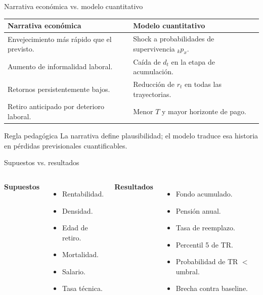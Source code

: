 \documentclass[aspectratio=169,11pt]{beamer}
\newcommand{\supuestos}{\textbf{Supuestos}}
\newcommand{\resultados}{\textbf{Resultados}}
\newcommand{\narrativa}{\textbf{Narrativa económica}}
\newcommand{\modelo}{\textbf{Modelo cuantitativo}}
\begin{document}
\begin{frame}{Narrativa económica vs. modelo cuantitativo}
\begin{table}
\centering
\begin{tabular}{p{}p{}}
\toprule
\narrativa & \modelo \\
\midrule
Envejecimiento más rápido que el previsto. & Shock a probabilidades de supervivencia ${}_{k}p_x$. \\
Aumento de informalidad laboral. & Caída de $d_t$ en la etapa de acumulación. \\
Retornos persistentemente bajos. & Reducción de $r_t$ en todas las trayectorias. \\
Retiro anticipado por deterioro laboral. & Menor $T$ y mayor horizonte de pago. \\
\bottomrule
\end{tabular}
\end{table}

\begin{block}{Regla pedagógica}
La narrativa define plausibilidad; el modelo traduce esa historia en pérdidas previsionales cuantificables.
\end{block}
\end{frame}

\begin{frame}{Supuestos vs. resultados}
\begin{columns}
\textbf{\supuestos}
\begin{itemize}
  \item Rentabilidad.
  \item Densidad.
  \item Edad de retiro.
  \item Mortalidad.
  \item Salario.
  \item Tasa técnica.
\end{itemize}

\textbf{\resultados}
\begin{itemize}
  \item Fondo acumulado.
  \item Pensión anual.
  \item Tasa de reemplazo.
  \item Percentil 5 de TR.
  \item Probabilidad de TR $<$ umbral.
  \item Brecha contra baseline.
\end{itemize}
\end{columns}
\end{frame}
\end{document}
